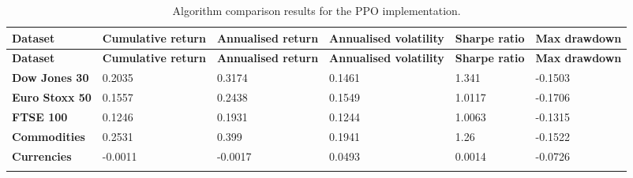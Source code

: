 \begin{longtable}{|l|p{2.1cm}|p{2.1cm}|p{2.1cm}|p{1.5cm}|p{2cm}|}
    \hline
    \textbf{Dataset} & \textbf{Cumulative return} & \textbf{Annualised return} & \textbf{Annualised volatility} & \textbf{Sharpe ratio} & \textbf{Max drawdown}  \\ \midrule
    \endfirsthead

    \hline
    \textbf{Dataset} & \textbf{Cumulative return} & \textbf{Annualised return} & \textbf{Annualised volatility} & \textbf{Sharpe ratio} & \textbf{Max drawdown}  \\ \midrule
    \endhead

    \endfoot
    \hline

    \textbf{Dow Jones 30} & 0.2035 & 0.3174 & 0.1461 & 1.341 & -0.1503 \\ \hline
    \textbf{Euro Stoxx 50} & 0.1557 & 0.2438 & 0.1549 & 1.0117 & -0.1706 \\ \hline
    \textbf{FTSE 100} & 0.1246 & 0.1931 & 0.1244 & 1.0063 & -0.1315 \\ \hline
    \textbf{Commodities} & 0.2531 & 0.399 & 0.1941 & 1.26 & -0.1522 \\ \hline
    \textbf{Currencies} & -0.0011 & -0.0017 & 0.0493 & 0.0014 & -0.0726 \\ \hline

    \caption{Algorithm comparison results for the PPO implementation.}
    \label{tab:experiment_algorithms_ppo}
\end{longtable}